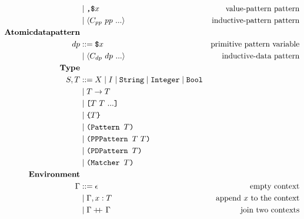 \documentclass[9pt, a4paper]{extarticle}
\theoremstyle{break}
\newcommand\doubleplus{+\kern-1.3ex+\kern0.8ex}
\newcommand{\bt}[1]{{\texttt{#1}}}
\newcommand{\eadt}[1]{{\bf{\langle}}#1{\bf{\rangle}}}
\newcommand{\tstr}{\bt{String}}
\newcommand{\tnum}{\bt{Integer}}
\newcommand{\tbool}{\bt{Bool}}
\newcommand{\tfun}[2]{#1\to#2}
\newcommand{\ttup}[1]{\bt{[}#1\bt{]}}
\newcommand{\tcol}[1]{\bt{\{}#1\bt{\}}}
\newcommand{\tpat}[1]{\bt{(Pattern }#1\bt{)}}
\newcommand{\tpppat}[1]{\bt{(PPPattern }#1\bt{)}}
\newcommand{\tpdpat}[1]{\bt{(PDPattern }#1\bt{)}}
\newcommand{\tmatcher}[1]{\bt{(Matcher }#1\bt{)}}
\newcommand{\tmatcherclause}[1]{\bt{(MatcherClause }#1\bt{)}}
\begin{document}
\begin{align*}
    & \mid \bt{,\$}x & \text{value-pattern pattern}\\
    & \mid \eadt{C_{pp}\ pp\ ...} & \text{inductive-pattern pattern} \\
  {\bf{Atomic data pattern}} & & \\
    dp & ::= \bt{\$}x & \text{primitive pattern variable}\\
    & \mid \eadt{C_{dp}\ dp\ ...} & \text{inductive-data pattern} \\
  {\bf{Type}} & & \\
    S,T & ::= X \mid I \mid \tstr \mid \tnum \mid \tbool \\
      & \mid \tfun{T}{T} \\
      & \mid \ttup{T\ T\ ...} \\
      & \mid \tcol{T} \\
      & \mid \tpat{T} \\
      & \mid \tpppat{T\ T} \\
      & \mid \tpdpat{T} \\
      & \mid \tmatcher{T} \\
  {\bf{Environment}} & & \\
    \Gamma & ::= \epsilon & \text{empty context}\\
    & \mid \Gamma,x:T & \text{append $x$ to the context}\\
    & \mid \Gamma \doubleplus \Gamma & \text{join two contexts}
\end{align*}
\end{document}
